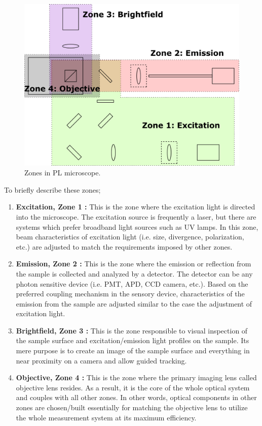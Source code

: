 \begin{figure}[H]
	\centering
	\includegraphics[angle=0,origin=c,width = 0.95\linewidth]{Section_Microscope/Figures/PL_Setup_Zones.png}
	\caption{Zones in PL microscope.}
	\label{fig:ConfocalReflectingMicroscopeZones}
\end{figure}

To briefly describe these zones;

\begin{enumerate}
	\item \textbf{Excitation, Zone 1 :} This is the zone where the excitation light is directed 
	into the microscope. The excitation source is frequently a laser, but there are systems
	which prefer broadband light sources such as UV lamps. In this zone, beam characteristics
	of excitation light (i.e. size, divergence, polarization, etc.) are adjusted to match the
	requirements imposed by other zones.

	\item \textbf{Emission, Zone 2 :} This is the zone where the emission or reflection from
	the sample is collected and analyzed by a detector. The detector can be any photon sensitive
	device (i.e. PMT, APD, CCD camera, etc.). Based on the preferred coupling mechanism in the
	sensory device, characteristics of the emission from the sample are adjusted similar to the 
	case the adjustment of excitation light.
	
	\item \textbf{Brightfield, Zone 3 :} This is the zone responsible to visual inspection of
	the sample surface and excitation/emission light profiles on the sample. Its mere purpose is
	to create an image of the sample surface and everything in near proximity on a camera and 
	allow guided tracking.
	
	\item \textbf{Objective, Zone 4 :} This is the zone where the primary imaging lens called
	objective lens resides. As a result, it is the core of the whole optical system and couples
	with all other zones. In other words, optical components in other zones are chosen/built 
	essentially for matching the objective lens to utilize the whole measurement system at its 
	maximum efficiency.
\end{enumerate}

